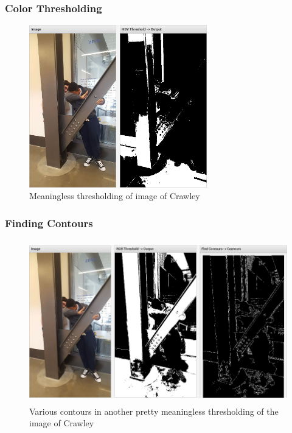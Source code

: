 \documentclass[../main.tex]{subfiles}
\begin{document}
\subsubsection{Color Thresholding}
\begin{figure}[H]
    \centering
    \includegraphics[height=200pt]{sections/vision/images/opencv/crawley/crawleyRandomThreshold.png}
    \caption{Meaningless thresholding of image of Crawley}
\end{figure}
\subsubsection{Finding Contours}
\begin{figure}[H]
    \centering
    \includegraphics[height=200pt]{sections/vision/images/opencv/crawley/crawleyContour.png}
    \caption{Various contours in another pretty meaningless thresholding of the image of Crawley}
\end{figure}
\end{document}
